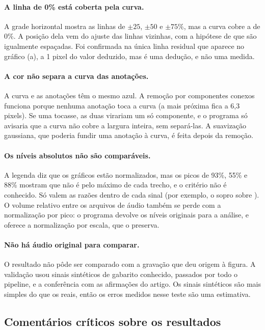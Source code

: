 \paragraph{A linha de 0\% está coberta pela curva.}
A grade horizontal mostra as linhas de $\pm25$, $\pm50$ e $\pm75\%$, mas a curva cobre a de 0\%. A posição dela vem do ajuste das linhas vizinhas, com a hipótese de que são igualmente espaçadas. Foi confirmada na única linha residual que aparece no gráfico (a), a 1 pixel do valor deduzido, mas é uma dedução, e não uma medida.

\paragraph{A cor não separa a curva das anotações.}
A curva e as anotações têm o mesmo azul. A remoção por componentes conexos funciona porque nenhuma anotação toca a curva (a mais próxima fica a 6,3 pixels). Se uma tocasse, as duas virariam um só componente, e o programa só avisaria que a curva não cobre a largura inteira, sem separá-las. A suavização gaussiana, que poderia fundir uma anotação à curva, é feita depois da remoção.

\paragraph{Os níveis absolutos não são comparáveis.}
A legenda diz que os gráficos estão normalizados, mas os picos de 93\%, 55\% e 88\% mostram que não é pelo máximo de cada trecho, e o critério não é conhecido. Só valem as razões dentro de cada sinal (por exemplo, o sopro sobre \Sone). O volume relativo entre os arquivos de áudio também se perde com a normalização por pico: o programa devolve os níveis originais para a análise, e oferece a normalização por escala, que o preserva.

\paragraph{Não há áudio original para comparar.}
O resultado não pôde ser comparado com a gravação que deu origem à figura. A validação usou sinais sintéticos de gabarito conhecido, passados por todo o pipeline, e a conferência com as afirmações do artigo. Os sinais sintéticos são mais simples do que os reais, então os erros medidos nesse teste são uma estimativa.

\subsection{Comentários críticos sobre os resultados}


